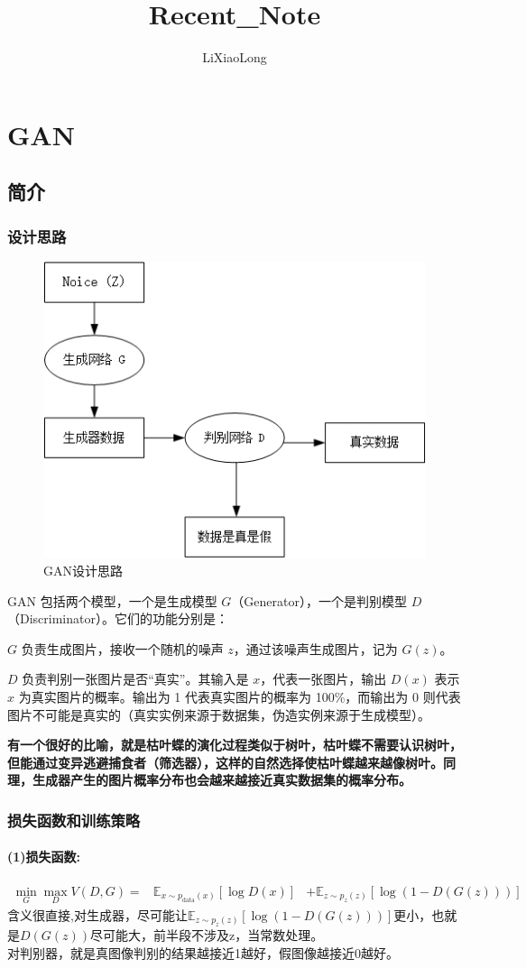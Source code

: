 \documentclass[]{report}
\title{Recent\_Note}
\author{LiXiaoLong}
\begin{document}
	
	\maketitle
	\tableofcontents
	\newpage
	\chapter{GAN}
	\section{简介}
	\subsection{设计思路}
	\begin{figure}[h]
		\centering
		\includegraphics[width=0.5\linewidth]{screenshot001}
		\caption{GAN设计思路}
		\label{fig:screenshot001}
	\end{figure}
	GAN 包括两个模型，一个是生成模型 \(G\)（Generator），一个是判别模型 \(D\)（Discriminator）。它们的功能分别是：
	
	\(G\) 负责生成图片，接收一个随机的噪声 \(z\)，通过该噪声生成图片，记为 \(G(z)\)。
	
	\(D\) 负责判别一张图片是否“真实”。其输入是 \(x\)，代表一张图片，输出 \(D(x)\) 表示 \(x\) 为真实图片的概率。输出为 1 代表真实图片的概率为 100\%，而输出为 0 则代表图片不可能是真实的（真实实例来源于数据集，伪造实例来源于生成模型）。
	
	\textbf{有一个很好的比喻，就是枯叶蝶的演化过程类似于树叶，枯叶蝶不需要认识树叶，但能通过变异逃避捕食者（筛选器），这样的自然选择使枯叶蝶越来越像树叶。同理，生成器产生的图片概率分布也会越来越接近真实数据集的概率分布。}
	
\subsection{损失函数和训练策略}
\subsubsection{(1)损失函数:}
	\begin{align}
		\min_G \max_D V(D, G) = & \mathbb{E}_{x \sim p_{\text{data}}(x)} [\log D(x)] 
		& + \mathbb{E}_{z \sim p_z(z)} [\log (1 - D(G(z)))]
	\end{align}
	含义很直接,对生成器，尽可能让$\mathbb{E}_{z \sim p_z(z)} [\log (1 - D(G(z)))]$更小，也就是$D(G(z))$尽可能大，前半段不涉及z，当常数处理。\\
	对判别器，就是真图像判别的结果越接近1越好，假图像越接近0越好。
\end{document}
